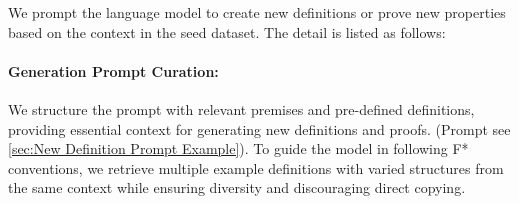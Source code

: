 We prompt the language model to create new definitions or prove new properties based on the context in the seed dataset. The detail is listed as follows:

    



\paragraph{Generation Prompt Curation:} We structure the prompt with relevant premises and pre-defined definitions, providing essential context for generating new definitions and proofs. (Prompt see \ref{sec:New Definition Prompt Example}). To guide the model in following F* conventions, we retrieve multiple example definitions with varied structures from the same context while ensuring diversity and discouraging direct copying.


